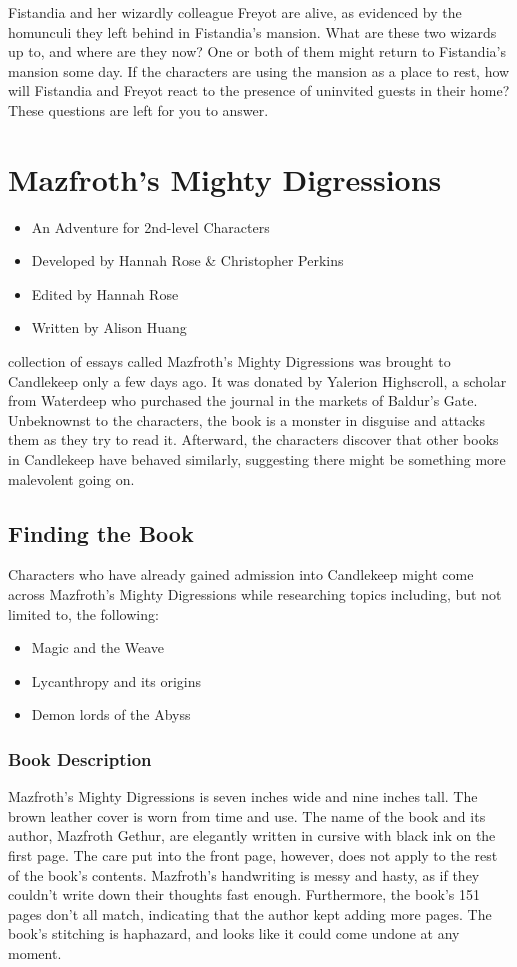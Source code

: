 \documentclass[10pt,a4paper,twoside,bg=print,twocolumn,openany,nodeprecatedcode]{dndbook}
\begin{document}
Fistandia and her wizardly colleague Freyot are alive, as evidenced by the homunculi they left behind in Fistandia's mansion. What are these two wizards up to, and where are they now? One or both of them might return to Fistandia's mansion some day. If the characters are using the mansion as a place to rest, how will Fistandia and Freyot react to the presence of uninvited guests in their home? These questions are left for you to answer.

\chapter{Mazfroth's Mighty Digressions}

\begin{itemize}
\item An Adventure for 2nd-level Characters
\item Developed by Hannah Rose \& Christopher Perkins
\item Edited by Hannah Rose
\item Written by Alison Huang
\end{itemize}

 collection of essays called Mazfroth's Mighty Digressions was brought to Candlekeep only a few days ago. It was donated by Yalerion Highscroll, a scholar from Waterdeep who purchased the journal in the markets of Baldur's Gate. Unbeknownst to the characters, the book is a monster in disguise and attacks them as they try to read it. Afterward, the characters discover that other books in Candlekeep have behaved similarly, suggesting there might be something more malevolent going on.


\section{Finding the Book}
Characters who have already gained admission into Candlekeep might come across Mazfroth's Mighty Digressions while researching topics including, but not limited to, the following:


\begin{itemize}
\item Magic and the Weave
\item Lycanthropy and its origins
\item Demon lords of the Abyss
\end{itemize}

\subsection{Book Description}
Mazfroth's Mighty Digressions is seven inches wide and nine inches tall. The brown leather cover is worn from time and use. The name of the book and its author, Mazfroth Gethur, are elegantly written in cursive with black ink on the first page. The care put into the front page, however, does not apply to the rest of the book's contents. Mazfroth's handwriting is messy and hasty, as if they couldn't write down their thoughts fast enough. Furthermore, the book's 151 pages don't all match, indicating that the author kept adding more pages. The book's stitching is haphazard, and looks like it could come undone at any moment.
\end{document}
